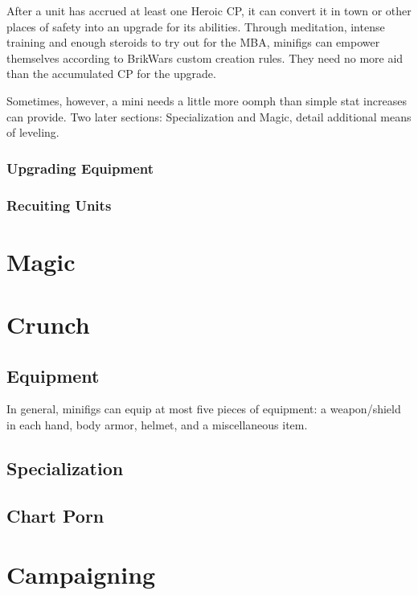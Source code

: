 \documentclass[12pt,a4paper,twocolumn]{article}
\begin{document}
After a unit has accrued at least one Heroic CP, it can convert it in town or other places of safety into an upgrade for its abilities.  Through meditation, intense training and enough steroids to try out for the MBA, minifigs can empower themselves according to BrikWars custom creation rules.  They need no more aid than the accumulated CP for the upgrade. 

Sometimes, however, a mini needs a little more oomph than simple stat increases can provide.  Two later sections: Specialization and Magic, detail additional means of leveling.

\subsubsection{Upgrading Equipment}

\subsubsection{Recuiting Units}

\section {Magic}

\section {Crunch}
\subsection{Equipment}

In general, minifigs can equip at most five pieces of equipment: a weapon/shield in each hand, body armor, helmet, and a miscellaneous item.  

\subsection{Specialization}
\subsection{Chart Porn}

\section {Campaigning }
\end{document}
